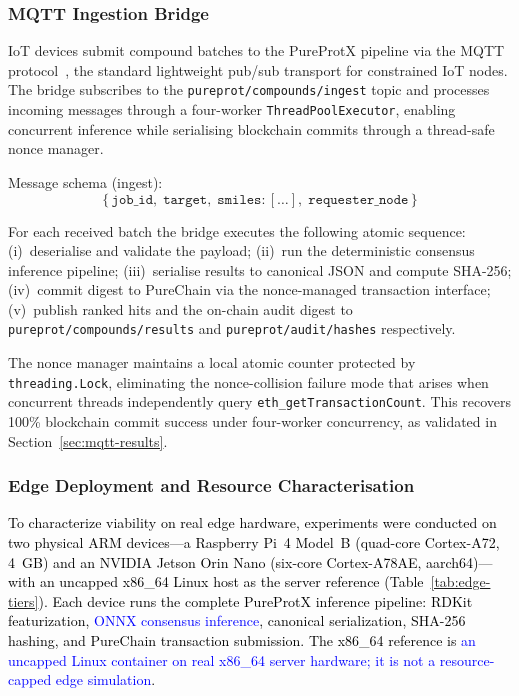 \documentclass[conference]{IEEEtran}
\newcommand{\rev}[2]{\textcolor{blue}{#2}}
\begin{document}
\subsubsection{MQTT Ingestion Bridge}
\label{sec:mqtt}

IoT devices submit compound batches to the PureProtX pipeline
via the MQTT protocol~\cite{mqtt5}, the standard lightweight
pub/sub transport for constrained IoT nodes.
The bridge subscribes to the \texttt{pureprot/compounds/ingest}
topic and processes incoming messages through a four-worker
\texttt{ThreadPoolExecutor}, enabling concurrent inference while
serialising blockchain commits through a thread-safe nonce manager.

Message schema (ingest):
\begin{equation*}
\{\,\texttt{job\_id},\; \texttt{target},\;
   \texttt{smiles}: [\ldots],\;
   \texttt{requester\_node}\,\}
\end{equation*}

For each received batch the bridge executes the following
atomic sequence: (i)~deserialise and validate the payload;
(ii)~run the deterministic consensus inference pipeline;
(iii)~serialise results to canonical JSON and compute SHA-256;
(iv)~commit digest to PureChain via the nonce-managed
transaction interface; (v)~publish ranked hits and the
on-chain audit digest to \texttt{pureprot/compounds/results}
and \texttt{pureprot/audit/hashes} respectively.

The nonce manager maintains a local atomic counter protected
by \texttt{threading.Lock}, eliminating the nonce-collision
failure mode that arises when concurrent threads independently
query \texttt{eth\_getTransactionCount}.
This recovers 100\% blockchain commit success under
four-worker concurrency, as validated in
Section~\ref{sec:mqtt-results}.

\subsubsection{Edge Deployment and Resource Characterisation}
\label{sec:edge-deploy}

\textcolor{black}{To characterize viability on real edge hardware,
experiments were conducted on two physical ARM devices---a
Raspberry Pi~4 Model~B (quad-core Cortex-A72, 4~GB) and an
NVIDIA Jetson Orin Nano (six-core Cortex-A78AE, aarch64)---with
an uncapped x86\_64 Linux host as the server reference
(Table~\ref{tab:edge-tiers}). Each device runs the complete
PureProtX inference pipeline: RDKit featurization, \rev{R2.1}{ONNX consensus inference}, canonical serialization, SHA-256 hashing,
and PureChain transaction submission. The x86\_64 reference is
\rev{R1.1}{an uncapped Linux container on real x86\_64 server hardware; it is not a resource-capped edge simulation}.}
\end{document}

